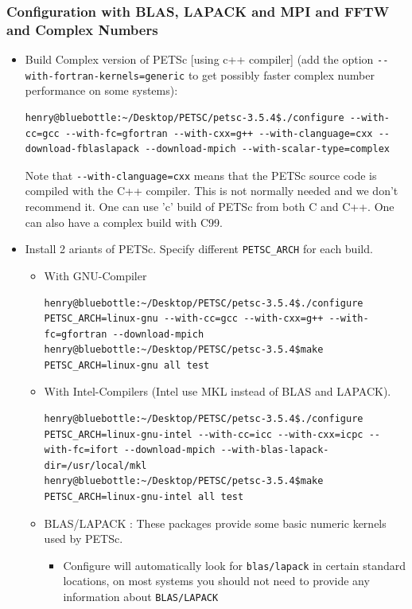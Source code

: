 \documentclass{article}
\begin{document}
\subsubsection{Configuration with BLAS, LAPACK and MPI and FFTW and Complex Numbers}
\begin{itemize}
\item Build Complex version of PETSc [using c++ compiler] (add the option \verb+--with-fortran-kernels=generic+ to get possibly faster complex number performance on some systems):
\tiny
\begin{verbatim}
henry@bluebottle:~/Desktop/PETSC/petsc-3.5.4$./configure --with-cc=gcc --with-fc=gfortran --with-cxx=g++ --with-clanguage=cxx --download-fblaslapack --download-mpich --with-scalar-type=complex
\end{verbatim}
\normalsize
Note that \verb+--with-clanguage=cxx+ means that the PETSc source code is compiled with the C++ compiler. This is not normally needed and we don't recommend it.
One can use 'c' build of PETSc from both C and C++. One can also have a complex build with C99.
\item Install 2 ariants of PETSc. Specify different \verb+PETSC_ARCH+ for each build.
\begin{itemize}
\item With GNU-Compiler
\tiny 
\begin{verbatim}
henry@bluebottle:~/Desktop/PETSC/petsc-3.5.4$./configure PETSC_ARCH=linux-gnu --with-cc=gcc --with-cxx=g++ --with-fc=gfortran --download-mpich
henry@bluebottle:~/Desktop/PETSC/petsc-3.5.4$make PETSC_ARCH=linux-gnu all test
\end{verbatim}
\normalsize
\item With Intel-Compilers (Intel use MKL instead of BLAS and LAPACK).
\tiny
\begin{verbatim}
henry@bluebottle:~/Desktop/PETSC/petsc-3.5.4$./configure PETSC_ARCH=linux-gnu-intel --with-cc=icc --with-cxx=icpc --with-fc=ifort --download-mpich --with-blas-lapack-dir=/usr/local/mkl
henry@bluebottle:~/Desktop/PETSC/petsc-3.5.4$make PETSC_ARCH=linux-gnu-intel all test
\end{verbatim}
\normalsize
\item BLAS/LAPACK : These packages provide some basic numeric kernels used by PETSc.
\begin{itemize}
\item Configure will automatically look for \verb+blas/lapack+ in certain standard locations, on most systems you should not need to provide any information about \verb+BLAS/LAPACK+ 

\end{itemize}
\end{itemize}
\end{itemize}
\end{document}
